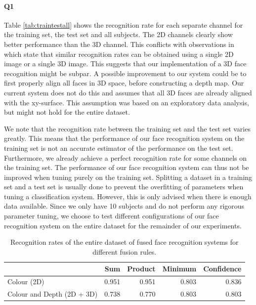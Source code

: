 \documentclass[]{article}
\begin{document}
\paragraph{Q1} Table \ref{tab:traintestall} shows the recognition rate for each separate channel for the training set, the test set and all subjects. The 2D channels clearly show better performance than the 3D channel. This conflicts with observations in \cite{chang2005evaluation,tsalakanidou2003use} which state that similar recognition rates can be obtained using a single 2D image or a single 3D image. This suggests that our implementation of a 3D face recognition might be subpar. A possible improvement to our system could be to first properly align all faces in 3D space, before constructing a depth map. Our current system does not do this and assumes that all 3D faces are already aligned with the xy-surface. This assumption was based on an exploratory data analysis, but might not hold for the entire dataset.

We note that the recognition rate between the training set and the test set varies greatly. This means that the performance of our face recognition system on the training set is not an accurate estimator of the performance on the test set. Furthermore, we already achieve a perfect recognition rate for some channels on the training set. The performance of our face recognition system can thus not be improved when tuning purely on the training set. Splitting a dataset in a training set and a test set is usually done to prevent the overfitting of parameters when tuning a classification system. However, this is only advised when there is enough data available. Since we only have 10 subjects and do not perform any rigorous parameter tuning, we choose to test different configurations of our face recognition system on the entire dataset for the remainder of our experiments.

\begin{table}
	\centering
	\begin{tabular}{lrrrr}
		\toprule
		& Sum & Product & Minimum & Confidence\\
		\midrule
		Colour (2D) & 0.951 & 0.951 & 0.803 & 0.836\\
		Colour and Depth (2D + 3D) & 0.738 & 0.770 & 0.803 & 0.803 \\
		\bottomrule
	\end{tabular}
	\caption{Recognition rates of the entire dataset of fused face recognition systems for different fusion rules.}
	\label{tab:fusion-rules}
\end{table}
\end{document}
